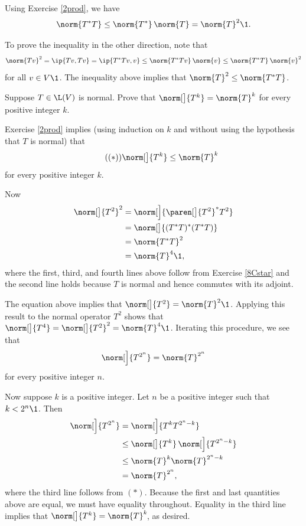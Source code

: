 \begin{Solution}
Using Exercise \ref{2prod}, we have
\[
\norm{T^*T} \le \norm{T^*} \, \norm{T} = \norm{T}^2\1.
\]

To prove the inequality in the other direction, note that
\[
\norm{Tv}^2 = \ip{Tv, Tv} = \ip{T^*Tv, v} \le \norm{T^*Tv} \, \norm{v} \le \norm{T^*T} \, \norm{v}^2
\]
for all $v \in V\1$. The inequality above implies that $\norm{T}^2 \le \norm{T^*T}$.
\end{Solution}

\exercise
Suppose $T \in \L(V)$ is normal. Prove that $\norm[\big]{T^k} = \norm{T}^k$ for every positive integer $k$.\label{7normTk}

\begin{Solution}
Exercise \ref{2prod} implies (using induction on $k$ and without using the hypothesis that $T$ is normal) that
\[ \tag{$(*)$}
\norm[\big]{T^k} \le \norm{T}^k
\]
for every positive integer $k$.

Now
\begin{align*}
\norm[\big]{T^2}^2 &= \norm[\Big]{ \paren[\big]{T^2}^* T^2 } \\
&= \norm[\big]{ (T^* T)^* (T^*T)}\\
&= \norm{T^*T}^2 \\
&= \norm{T}^4\1,
\end{align*}
where the first, third, and fourth lines above follow from Exercise \ref{8Cstar} and the second line holds because $T$ is normal and hence commutes with its adjoint.

The equation above implies that $\norm[\big]{T^2} = \norm{T}^2\1$. Applying this result to the normal operator $T^2$ shows that
$\norm[\big]{T^4} = \norm[\big]{T^2}^2 = \norm{T}^4\1$. Iterating this procedure, we see that
\[
\norm[\Big]{ T^{2^n} } = \norm{T}^{2^n}
\]
for every positive integer $n$.

Now suppose $k$ is a positive integer. Let $n$ be a positive integer such that $k < 2^n\1$. Then
\begin{align*}
\norm[\Big]{T^{2^n} } &= \norm[\Big]{ T^k T^{2^n - k} }\\
&\le \norm[\big]{T^k} \,\norm[\Big]{T^{2^n - k}} \\
&\le \norm{T}^k \norm{T}^{2^n - k} \\
&= \norm{T}^{2^n},
\end{align*}
where the third line follows from $(*)$. Because the first and last quantities above are equal, we must have equality throughout. Equality in the third line implies that $\norm[\big]{T^k} = \norm{T}^k\!$, as desired.
\end{Solution}

